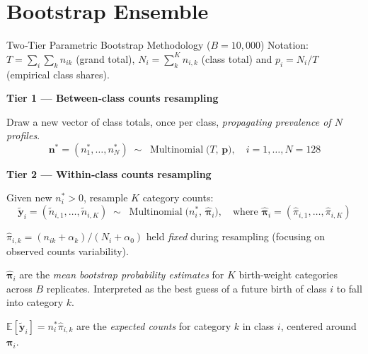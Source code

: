 \documentclass[aspectratio=169,professionalfonts]{beamer}
\begin{document}
\section{Bootstrap Ensemble}
\begin{frame}{Two‑Tier Parametric Bootstrap Methodology (\(B = 10,000\))}
\footnotesize
Notation: \(T=\sum_i \sum_k n_{ik}\) (grand total), \(N_i = \sum_k^K n_{i,k}\) (class total) and \(p_i = N_i/T\) (empirical class shares).

\textbf{Tier 1 — Between‑class counts resampling}\par
Draw a new vector of class totals, once per class, \emph{propagating prevalence of \(N\) profiles}.
\[
  \mathbf{n}^\ast = (n_1^{\ast},\dots,n_{N}^{\ast}) \;\sim\; \operatorname{Multinomial}\bigl(T,\,\mathbf p\bigr), \quad i = 1,\dots, N=128
\]

\textbf{Tier 2 — Within‑class counts resampling}\par
Given new \(n_i^{\ast}>0\), resample \(K\) category counts:
\[
  \tilde{\mathbf{y}}_i = (\tilde n_{i,1},\dots,\tilde n_{i,K})
  \;\sim\; \operatorname{Multinomial}\bigl(n_i^{\ast},\,\hat{\boldsymbol\pi}_i\bigr), \quad \text{where } \hat{\boldsymbol{\pi}}_i  = (\hat{\pi}_{i,1}, \dots, \hat{\pi}_{i,K})
\]

\(\hat{\pi}_{i,k} = (n_{ik}+\alpha_k)/(N_i + \alpha_0)\) held \emph{fixed} during resampling (focusing on observed counts variability).

\(\hat{\boldsymbol\pi}_i\) are the \emph{mean bootstrap probability estimates} for \(K\) birth-weight categories across \(B\) replicates. Interpreted as the best guess of a future birth of class \(i\) to fall into category \(k\).

\(\mathbb{E}[\tilde{\mathbf{y}}_i] = n_i^\ast \hat{\pi}_{i,k} \)
are the \emph{expected counts} for category \(k\) in class \(i\), centered around \(\boldsymbol{\pi}_i\).


\end{frame}
\end{document}
